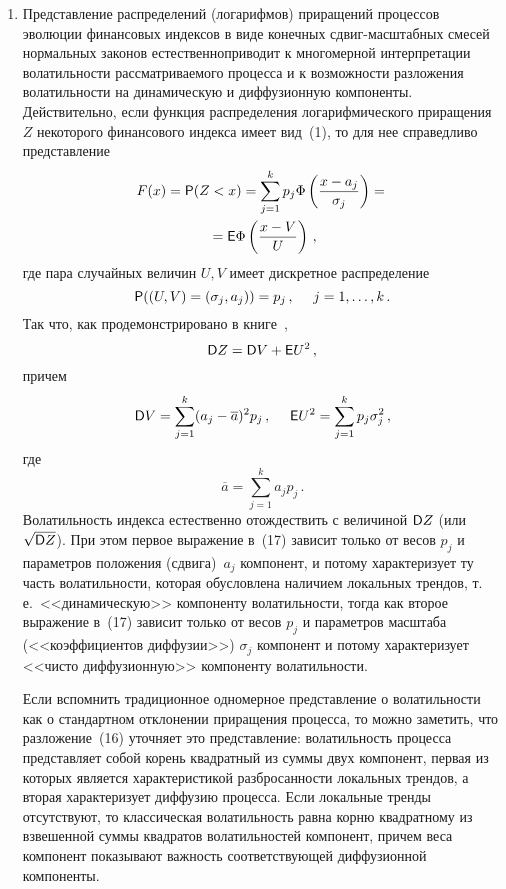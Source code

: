 \begin{multicols}{2}
\begin{enumerate}[(1)]
\item Представление распределений (логарифмов) приращений
процессов эволюции финансо\-вых индексов в виде конечных
сдвиг-мас\-штаб\-ных смесей нормальных законов естественно\linebreak приводит к
многомерной интерпретации волатильности рассматриваемого процесса
и к возможности разложения волатильности на динамическую и
диффузионную компоненты.\linebreak
 Действительно, если функция распределения
логарифмического приращения $Z$ некоторого финансового индекса
имеет вид~(1), то для нее справедливо представление
\begin{multline*}
F(x)={\sf
P}(Z<x)=\sum\limits_{j=1}^kp_j\Phi\left(\displaystyle\frac{\displaystyle x-a_j\mathstrut}{\displaystyle \sigma_j\mathstrut}\right)={}\\
{}={\sf
E}\Phi\left(\displaystyle\frac{\displaystyle x-V\mathstrut}{\displaystyle U\mathstrut}\right)\,,
\end{multline*}
где пара случайных величин $U,V$ имеет дискретное распределение
$$
{\sf P}((U,V)=(\sigma_j,a_j))=p_j\,,\ \ \ \ j=1,\ldots,k\,.
$$
Так что, как продемонстрировано в книге~\cite{Korolev2007a},
\begin{equation}
{\sf D}Z={\sf D}V+{\sf E}U^2\,,
\end{equation}
причем
\begin{equation}
{\sf D}V=\sum\limits_{j=1}^k(a_j-\overline a)^2p_j\,,\ \ \ \ {\sf
E}U^2=\sum\limits_{j=1}^kp_j\sigma_j^2\,,
\end{equation}
где
$$
\overline a=\sum\limits_{j=1}^ka_jp_j\,.
$$
Волатильность индекса естественно отождествить с величиной ${\sf
D}Z$ (или $\sqrt{{\sf D}Z}$). При этом первое выражение в~(17)
зависит только от весов $p_j$ и параметров положения (сдвига)~$a_j$
компонент, и потому характеризует ту часть волатильности,
которая обусловлена наличием\linebreak
 локальных трендов, т.\,е.\ <<динамическую>> компоненту волатильности, тогда как второе
выражение в~(17) зависит только от весов $p_j$ и па\-ра\-мет\-ров масштаба (<<коэффициентов диффузии>>) $\sigma_j$ компонент и
потому характеризует <<чисто диффузионную>> компоненту волатильности.

Если вспомнить традиционное одномерное представление о волатильности как о стандартном отклонении приращения процесса, то
можно заметить, что разложение~(16) уточняет это представление:
волатильность процесса представляет собой корень квадратный из суммы двух компонент, первая из которых является характеристикой
разбросанности локальных трендов, а вторая характеризует диффузию
процесса. Если локальные тренды отсутствуют, то классическая волатильность равна корню квадратному из взвешенной суммы
квадратов волатильностей компонент, причем веса компонент показывают важность соответствующей диффузионной компоненты.


\end{enumerate}
\end{multicols}
